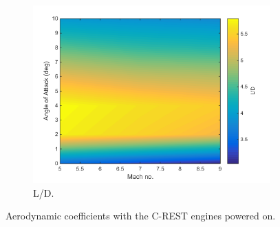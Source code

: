 \begin{figure}
\begin{subfigure}{.5\textwidth}
				\includegraphics[width=0.99\linewidth]{figures/3_vehicle_design/LD-EngineOn}
				\caption{L/D.}
				\label{fig:LD-EngineOn}
			\end{subfigure}
			\caption{Aerodynamic coefficients with the C-REST engines powered on.}
		\end{figure}
		

